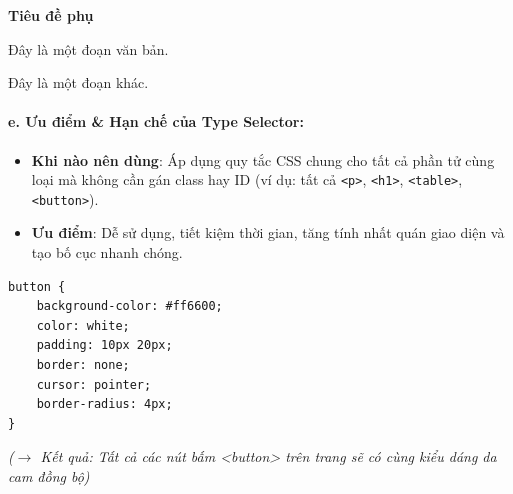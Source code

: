 \documentclass[11pt,oneside]{book}
\newcommand{\codeinline}[1]{\textcolor{accentOrange}{\texttt{#1}}}
\begin{document}
\begin{browserWindow}
\sffamily\small
{} \par\vspace{2pt}
\flushleft
\textcolor{darkText}{\Large\bfseries Tiêu đề phụ} \par\vspace{2pt}
\textcolor{primaryBlue}{Đây là một đoạn văn bản.} \par\vspace{2pt}
\textcolor{primaryBlue}{Đây là một đoạn khác.}
\end{browserWindow}

\paragraph{e. Ưu điểm \& Hạn chế của Type Selector:}

\begin{tipBox}
\begin{itemize}[leftmargin=1.5em, itemsep=3pt, parsep=0pt]
    \item \textbf{Khi nào nên dùng}: Áp dụng quy tắc CSS chung cho tất cả phần tử cùng loại mà không cần gán class hay ID (ví dụ: tất cả \codeinline{<p>}, \codeinline{<h1>}, \codeinline{<table>}, \codeinline{<button>}).
    \item \textbf{Ưu điểm}: Dễ sử dụng, tiết kiệm thời gian, tăng tính nhất quán giao diện và tạo bố cục nhanh chóng.
\end{itemize}
\end{tipBox}

\begin{codeWindow}
\begin{lstlisting}[language=CSS3]
button {
    background-color: #ff6600;
    color: white;
    padding: 10px 20px;
    border: none;
    cursor: pointer;
    border-radius: 4px;
}
\end{lstlisting}
\end{codeWindow}

\begin{browserWindow}
\sffamily\small\centering
{} \quad
{} \par\vspace{4pt}
\textcolor{gray!70}{\small\textit{($\rightarrow$ Kết quả: Tất cả các nút bấm <button> trên trang sẽ có cùng kiểu dáng da cam đồng bộ)}}
\end{browserWindow}
\end{document}
